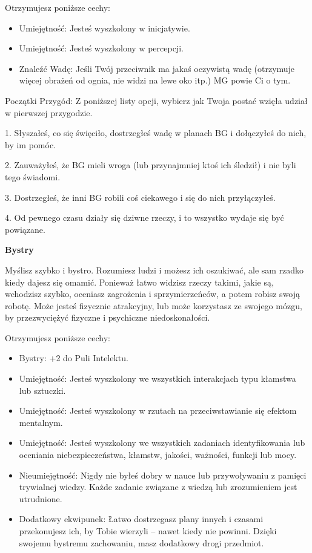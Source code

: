 Otrzymujesz poniższe cechy:
\begin{itemize}
\item Umiejętność: Jesteś wyszkolony w inicjatywie.
\item Umiejętność: Jesteś wyszkolony w percepcji.
\item Znaleźć Wadę: Jeśli Twój przeciwnik ma jakaś oczywistą wadę (otrzymuje więcej obrażeń od ognia, nie widzi na lewe oko itp.) MG powie Ci o tym.
\end{itemize}
    
Początki Przygód: Z poniższej listy opcji, wybierz jak Twoja postać wzięła udział w pierwszej przygodzie.

1. Słyszałeś, co się święciło, dostrzegłeś wadę w planach BG i dołączyłeś do nich, by im pomóc.

2. Zauważyłeś, że BG mieli wroga (lub przynajmniej ktoś ich śledził) i nie byli tego świadomi.

3. Dostrzegłeś, że inni BG robili coś ciekawego i się do nich przyłączyłeś.

4. Od pewnego czasu działy się dziwne rzeczy, i to wszystko wydaje się być powiązane.

\textbf{Bystry}

Myślisz szybko i bystro. Rozumiesz ludzi i możesz ich oszukiwać, ale sam rzadko kiedy dajesz się omamić. Ponieważ łatwo widzisz rzeczy takimi, jakie są, wchodzisz szybko, oceniasz zagrożenia i sprzymierzeńców, a potem robisz swoją robotę. Może jesteś fizycznie atrakcyjny, lub może korzystasz ze swojego mózgu, by przezwyciężyć fizyczne i psychiczne niedoskonałości. 

Otrzymujesz poniższe cechy:
\begin{itemize}
\item Bystry: +2 do Puli Intelektu.
\item Umiejętność: Jesteś wyszkolony we wszystkich interakcjach typu kłamstwa lub sztuczki.
\item Umiejętność: Jesteś wyszkolony w rzutach na przeciwstawianie się efektom mentalnym.
\item Umiejętność: Jesteś wyszkolony we wszystkich zadaniach identyfikowania lub oceniania niebezpieczeństwa, kłamstw, jakości, ważności, funkcji lub mocy.
\item Nieumiejętność: Nigdy nie byłeś dobry w nauce lub przywoływaniu z pamięci trywialnej wiedzy. Każde zadanie związane z wiedzą lub zrozumieniem jest utrudnione.
\item Dodatkowy ekwipunek: Łatwo dostrzegasz plany innych i czasami przekonujesz ich, by Tobie wierzyli – nawet kiedy nie powinni. Dzięki swojemu bystremu zachowaniu, masz dodatkowy drogi przedmiot.
\end{itemize}

